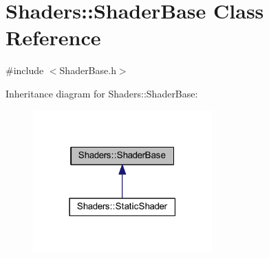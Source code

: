 \hypertarget{class_shaders_1_1_shader_base}{}\section{Shaders\+:\+:Shader\+Base Class Reference}
\label{class_shaders_1_1_shader_base}


{\ttfamily \#include $<$Shader\+Base.\+h$>$}



Inheritance diagram for Shaders\+:\+:Shader\+Base\+:
\nopagebreak
\begin{figure}[H]
\begin{center}
\leavevmode
\includegraphics[width=195pt]{class_shaders_1_1_shader_base__inherit__graph}
\end{center}
\end{figure}
